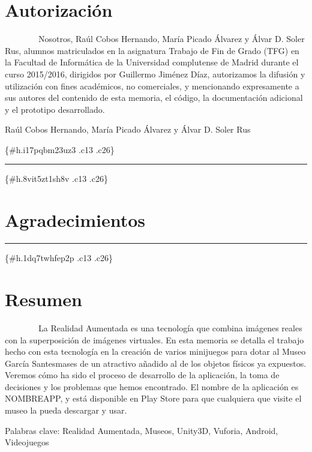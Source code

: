 \section{Autorización}\label{h.dq7ahit8sjpf}

~~~~~~~~Nosotros, Raúl Cobos Hernando, María Picado Álvarez y Álvar D.
Soler Rus, alumnos matriculados en la asignatura Trabajo de Fin de Grado
(TFG) en la Facultad de Informática de la Universidad complutense de
Madrid durante el curso 2015/2016, dirigidos por Guillermo Jiménez Díaz,
autorizamos la difusión y utilización con fines académicos, no
comerciales, y mencionando expresamente a sus autores del contenido de
esta memoria, el código, la documentación adicional y el prototipo
desarrollado.

Raúl Cobos Hernando, María Picado Álvarez y Álvar D. Soler Rus

\{\#h.i17pqbm23uz3 .c13 .c26\}

\begin{center}\rule{3in}{0.4pt}\end{center}

\{\#h.8vit5zt1sh8v .c13 .c26\}

\section{Agradecimientos}\label{h.l576qby6rf7i}

\begin{center}\rule{3in}{0.4pt}\end{center}

\{\#h.1dq7twhfep2p .c13 .c26\}

\section{Resumen}\label{h.a9b04t74nw7y}

~~~~~~~~La Realidad Aumentada es una tecnología que combina imágenes
reales con la superposición de imágenes virtuales. En esta memoria se
detalla el trabajo hecho con esta tecnología en la creación de varios
minijuegos para dotar al Museo García Santesmases de un atractivo
añadido al de los objetos físicos ya expuestos. Veremos cómo ha sido el
proceso de desarrollo de la aplicación, la toma de decisiones y los
problemas que hemos encontrado. El nombre de la aplicación es NOMBREAPP,
y está disponible en Play Store para que cualquiera que visite el museo
la pueda descargar y usar.

Palabras clave: Realidad Aumentada, Museos, Unity3D, Vuforia, Android,
Videojuegos

